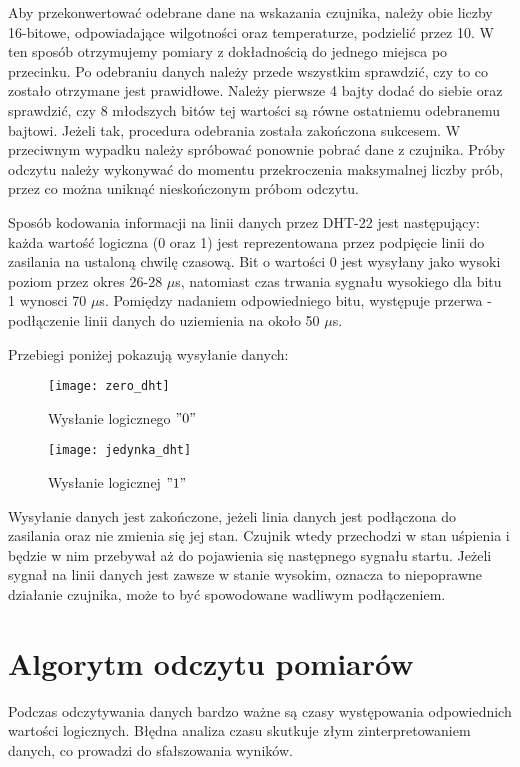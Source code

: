 Aby przekonwertować odebrane dane na wskazania czujnika, należy obie liczby 16-bitowe, odpowiadające wilgotności oraz temperaturze, podzielić przez 10. W ten sposób otrzymujemy pomiary z dokładnością do jednego miejsca po przecinku. Po odebraniu danych należy przede wszystkim sprawdzić, czy to co zostało otrzymane jest prawidłowe. Należy pierwsze 4 bajty dodać do siebie oraz sprawdzić, czy 8 młodszych bitów tej wartości są równe ostatniemu odebranemu bajtowi. Jeżeli tak, procedura odebrania została zakończona sukcesem. W przeciwnym wypadku należy spróbować ponownie pobrać dane z czujnika. Próby odczytu należy wykonywać do momentu przekroczenia maksymalnej liczby prób, przez co można uniknąć nieskończonym próbom odczytu.

Sposób kodowania informacji na linii danych przez DHT-22 jest następujący: każda wartość logiczna (0 oraz 1) jest reprezentowana przez podpięcie linii do zasilania na ustaloną chwilę czasową. Bit o wartości 0 jest wysyłany jako wysoki poziom przez okres 26-28 $\mu$s, natomiast czas trwania sygnału wysokiego dla bitu 1 wynosci 70 $\mu$s. Pomiędzy nadaniem odpowiedniego bitu, występuje przerwa - podłączenie linii danych do uziemienia na około 50 $\mu$s.

Przebiegi poniżej pokazują wysyłanie danych:
\begin{figure}[h]
\centering
\texttt{[image: zero\_dht]}
\caption{Wysłanie logicznego $"0"$}
\label{fig:zero_dht}
\end{figure}

\begin{figure}[h]
\centering
\texttt{[image: jedynka\_dht]}
\caption{Wysłanie logicznej $"1"$}
\label{fig:jedynka_dht}
\end{figure}

Wysyłanie danych jest zakończone, jeżeli linia danych jest podłączona do zasilania oraz nie zmienia się jej stan. Czujnik wtedy przechodzi w stan uśpienia i będzie w nim przebywał aż do pojawienia się następnego sygnału startu. Jeżeli sygnał na linii danych jest zawsze w stanie wysokim, oznacza to niepoprawne działanie czujnika, może to być spowodowane wadliwym podłączeniem. 

\section*{Algorytm odczytu pomiarów}
Podczas odczytywania danych bardzo ważne są czasy występowania odpowiednich wartości logicznych. Błędna analiza czasu skutkuje złym zinterpretowaniem danych, co prowadzi do sfałszowania wyników.

